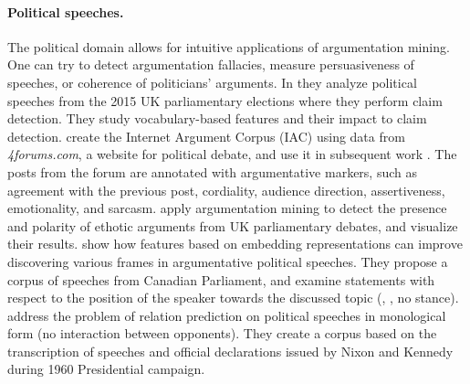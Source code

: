 \paragraph{Political speeches. }
The political domain allows for intuitive applications of argumentation mining. 
One can try to detect argumentation fallacies, measure persuasiveness of speeches, or
coherence of politicians' arguments. 
In \citep{lippi2016argument} they analyze political speeches from the 2015
UK parliamentary elections where they perform claim detection. 
They study vocabulary-based features and their impact to claim detection. 
\citet{walker2012corpus} create the Internet Argument Corpus (IAC) using
data from \emph{4forums.com}, a website for political debate, and use it
in subsequent work \citep{walker2012stance, abbott2016internet}. 
The posts from the forum are annotated with argumentative markers, such
as agreement with the previous post, cordiality, audience direction, 
assertiveness, emotionality, and sarcasm. 
\citet{duthie2016mining} apply argumentation mining to detect the presence and polarity 
of ethotic arguments from UK parliamentary debates, and visualize their results. 
\citet{naderi2015argumentation}  show how features based on embedding representations 
can improve discovering various frames in argumentative political speeches.
They propose a corpus of speeches from Canadian Parliament, and examine statements 
with respect to the position of the speaker towards the discussed topic
(, , no stance).
\citet{menini2018never} address the problem of relation prediction on 
political speeches in monological form (no interaction between opponents).
They create a corpus based on the transcription of speeches and official declarations 
issued by Nixon and Kennedy during 1960 Presidential campaign.

